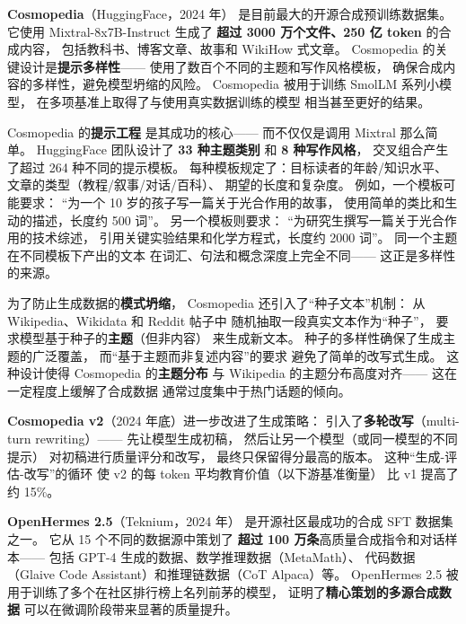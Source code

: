 \textbf{Cosmopedia}（HuggingFace，2024 年）
是目前最大的开源合成预训练数据集。
它使用 Mixtral-8x7B-Instruct 生成了
\textbf{超过 3000 万个文件、250 亿 token} 的合成内容，
包括教科书、博客文章、故事和 WikiHow 式文章。
Cosmopedia 的关键设计是\textbf{提示多样性}——
使用了数百个不同的主题和写作风格模板，
确保合成内容的多样性，避免模型坍缩的风险。
Cosmopedia 被用于训练 SmolLM 系列小模型，
在多项基准上取得了与使用真实数据训练的模型
相当甚至更好的结果。

Cosmopedia 的\textbf{提示工程}
是其成功的核心——
而不仅仅是调用 Mixtral 那么简单。
HuggingFace 团队设计了 \textbf{33 种主题类别}
和 \textbf{8 种写作风格}，
交叉组合产生了超过 264 种不同的提示模板。
每种模板规定了：目标读者的年龄/知识水平、
文章的类型（教程/叙事/对话/百科）、
期望的长度和复杂度。
例如，一个模板可能要求：
``为一个 10 岁的孩子写一篇关于光合作用的故事，
使用简单的类比和生动的描述，长度约 500 词''。
另一个模板则要求：
``为研究生撰写一篇关于光合作用的技术综述，
引用关键实验结果和化学方程式，长度约 2000 词''。
同一个主题在不同模板下产出的文本
在词汇、句法和概念深度上完全不同——
这正是多样性的来源。

为了防止生成数据的\textbf{模式坍缩}，
Cosmopedia 还引入了``种子文本''机制：
从 Wikipedia、Wikidata 和 Reddit 帖子中
随机抽取一段真实文本作为``种子''，
要求模型基于种子的\textbf{主题}（但非内容）
来生成新文本。
种子的多样性确保了生成主题的广泛覆盖，
而``基于主题而非复述内容''的要求
避免了简单的改写式生成。
这种设计使得 Cosmopedia 的\textbf{主题分布}
与 Wikipedia 的主题分布高度对齐——
这在一定程度上缓解了合成数据
通常过度集中于热门话题的倾向。

\textbf{Cosmopedia v2}（2024 年底）进一步改进了生成策略：
引入了\textbf{多轮改写}（multi-turn rewriting）——
先让模型生成初稿，
然后让另一个模型（或同一模型的不同提示）
对初稿进行质量评分和改写，
最终只保留得分最高的版本。
这种``生成-评估-改写''的循环
使 v2 的每 token 平均教育价值（以下游基准衡量）
比 v1 提高了约 15\%。

\textbf{OpenHermes 2.5}（Teknium，2024 年）
是开源社区最成功的合成 SFT 数据集之一。
它从 15 个不同的数据源中策划了
\textbf{超过 100 万条}高质量合成指令和对话样本——
包括 GPT-4 生成的数据、数学推理数据（MetaMath）、
代码数据（Glaive Code Assistant）和推理链数据（CoT Alpaca）等。
OpenHermes 2.5 被用于训练了多个在社区排行榜上名列前茅的模型，
证明了\textbf{精心策划的多源合成数据}
可以在微调阶段带来显著的质量提升。

